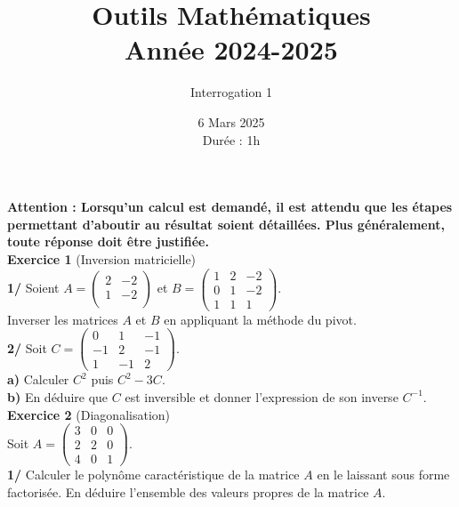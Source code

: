 \documentclass[a4paper,12pt]{article}
\title{Outils Mathématiques \\
Année 2024-2025}
\author{Interrogation 1}
\date{6 Mars 2025 \\
Durée : 1h}
\begin{document}
\maketitle

\textbf{Attention : Lorsqu'un calcul est demandé, il est attendu que les étapes permettant d'aboutir au résultat soient détaillées. Plus généralement, toute réponse doit être justifiée.} \\


\textbf{Exercice 1} (Inversion matricielle) \\

\textbf{1/} Soient \( A = \begin{pmatrix}
2 & -2 \\
1 & -2 \\
\end{pmatrix} \) et \( B = \begin{pmatrix}
1 & 2 & -2 \\
0 & 1 & -2 \\
1 & 1 & 1
\end{pmatrix} \). \\

Inverser les matrices $A$ et $B$ en appliquant la méthode du pivot. \\

\textbf{2/} Soit \( C = \begin{pmatrix}
0 & 1 & -1 \\
-1 & 2 & -1 \\
1 & -1 & 2
\end{pmatrix} \).  \\

\textbf{a)} Calculer $C^2$ puis $C^2-3C$. \\

\textbf{b)} En déduire que $C$ est inversible et donner l'expression de son inverse $C^{-1}$. \\

\textbf{Exercice 2} (Diagonalisation) \\

Soit \( A = \begin{pmatrix}
3 & 0 & 0 \\
2 & 2 & 0 \\
4 & 0 & 1
\end{pmatrix} \).\\

\textbf{1/} Calculer le polynôme caractéristique de la matrice $A$ en le laissant sous forme factorisée. En déduire l'ensemble des valeurs propres de la matrice $A$. \\
\end{document}
